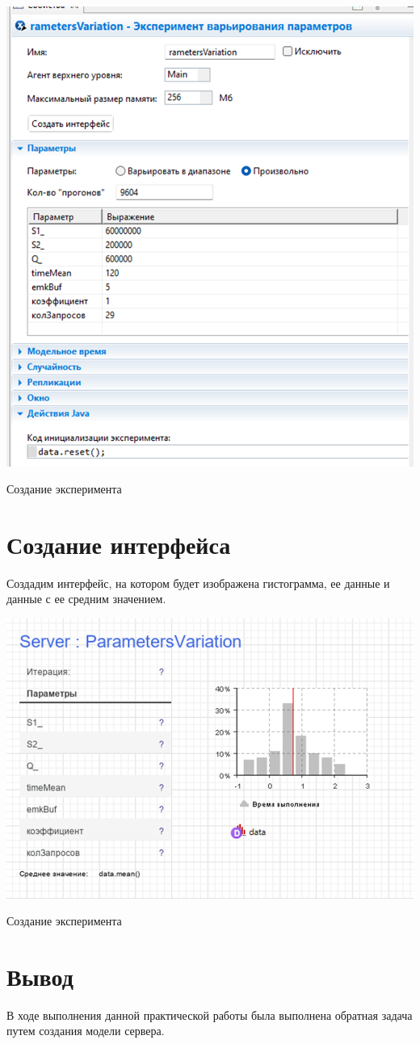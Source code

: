 \begin{image}
	\includegraphics[width=1\textwidth]{img2}
	\caption{Создание эксперимента}
	\label{fig:data}
\end{image}

\clearpage

\section{Создание интерфейса}
Создадим интерфейс, на котором будет изображена гистограмма, ее данные и данные с ее средним значением.

\begin{image}
	\includegraphics[width=1\textwidth]{img3}
	\caption{Создание эксперимента}
	\label{fig:interface}
\end{image}

\clearpage

\section{Вывод}
В ходе выполнения данной практической работы была выполнена обратная задача путем создания модели сервера.
